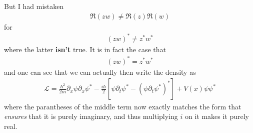 \documentclass[a4paper]{article}
\begin{document}
    But I had mistaken \begin{align*}
        \Re(zw) \neq \Re (z)\Re (w)
    \end{align*}
    for \begin{align*}
        (zw)^{\ast} \neq z^{\ast} w^{\ast} 
    \end{align*}
    where the latter \textbf{isn't} true. It is in fact the case that \begin{align*}
        (zw)^{\ast} = z^{\ast} w^{\ast} 
    \end{align*} 
    and one can see that we can actually then write the density as \begin{align*}
        \mathcal{L} = \frac{\hbar^{2} }{2m}\partial _x \psi \partial _x \psi ^{\ast} - \frac{i\hbar}{2}\left[ \psi \partial _t \psi ^{\ast} - \left( \psi \partial _t \psi ^{\ast} \right)^{\ast} \right] + V(x) \psi \psi ^{\ast} 
    \end{align*}
    where the parantheses of the middle term now exactly matches the form that \textit{ensures} that it is purely imaginary, and thus multiplying \(i\) on it makes it purely real. 
\end{document}
